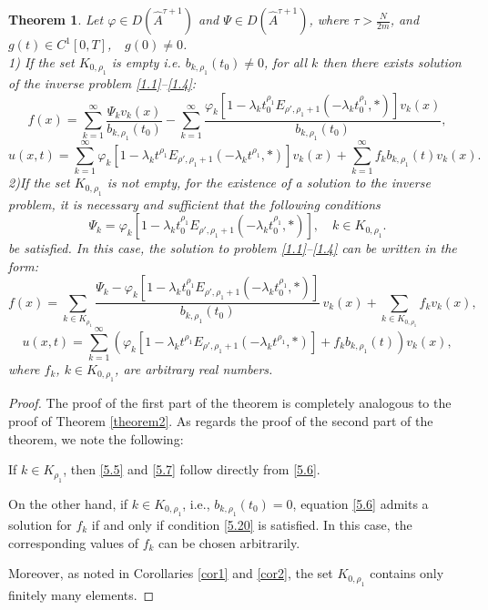 \documentclass[12pt, reqno]{amsart}
\newtheorem{theorem}{Theorem}[section]
\theoremstyle{definition}
\theoremstyle{remark}
\numberwithin{equation}{section}
\begin{document}
\begin{theorem}\label{theorem3}
    Let $\varphi \in D(\widehat{A}^{\tau+1})$ and $\Psi \in D(\widehat{A}^{\tau+1})$, where
$
\tau > \frac{N}{2m}$, and $g(t) \in C^1[0,T]$, \,\, $g(0) \neq 0$.\\
    1) If the set $K_{0,\rho_1}$ is empty i.e. $b_{k,\rho_1}(t_0)\neq 0$, for all $k$ then there exists solution of the inverse problem \eqref{1.1}--\eqref{1.4}:
    $$
    f(x)=\sum_{k=1}^{\infty}\frac{\Psi_k v_k(x)}{b_{k,\rho_1}(t_0)}-\sum_{k=1}^{\infty}\frac{\varphi_k \left[ 1 - \lambda_k t_0^{\rho_1} E_{ \rho', \rho_1 + 1} \left( -\lambda_k t_0^{\rho_1}, * \right) \right]v_k(x)}{b_{k,\rho_1}(t_0)},
    $$
    $$
   u(x,t)= \sum_{k=1}^{\infty}\varphi_k \left[ 1 - \lambda_k t^{\rho_1} E_{ \rho', \rho_1 + 1} \left( -\lambda_k t^{\rho_1}, * \right) \right]v_k(x)+\sum_{k=1}^{\infty}f_kb_{k,\rho_1}(t) v_k(x).
    $$
    2)If the set $K_{0,\rho_1}$ is not empty, for the existence of a solution to the inverse problem, it is necessary and sufficient that the following conditions
    \begin{equation}\label{5.20}
\Psi_k = \varphi_k \left[ 1 - \lambda_k t_0^{\rho_1} E_{ \rho', \rho_1 + 1} \left( -\lambda_k t_0^{\rho_1}, * \right) \right],
\quad k \in K_{0,\rho_1}.
\end{equation}
    be satisfied. In this case, the solution to problem \eqref{1.1}–\eqref{1.4} can be written in the form:
\[
f(x)=\sum_{k\in K_{\rho_1}}
\frac{\Psi_k -\varphi_k \left[ 1 - \lambda_k t_0^{\rho_1} E_{\rho', \rho_1 + 1} \left( -\lambda_k t_0^{\rho_1}, * \right) \right]}
{b_{k,\rho_1}(t_0)}\, v_k(x)
+\sum_{k\in K_{0,\rho_1}} f_k v_k(x),
\]
\[
u(x,t)
=
\sum_{k=1}^{\infty}
\left(\varphi_k
\left[
1-\lambda_k t^{\rho_1}
E_{\rho',\rho_1+1}\!\left(-\lambda_k t^{\rho_1},*\right)
\right]+ f_k b_{k,\rho_1}(t)\right) v_k(x),
\]
where $f_k$, $k \in K_{0,\rho_1}$, are arbitrary real numbers.
\end{theorem}
\begin{proof}
The proof of the first part of the theorem is completely analogous to the proof of Theorem
\ref{theorem2}. As regards the proof of the second part of the theorem, we note the following:

If $k \in K_{\rho_1}$, then \eqref{5.5} and \eqref{5.7} follow directly from \eqref{5.6}.

On the other hand, if $k \in K_{0,\rho_1}$, i.e., $b_{k,\rho_1}(t_0) = 0$, equation \eqref{5.6} admits a solution for $f_k$ if and only if condition \eqref{5.20} is satisfied. In this case, the corresponding values of $f_k$ can be chosen arbitrarily.

Moreover, as noted in Corollaries \eqref{cor1} and \eqref{cor2}, the set $K_{0,\rho_1}$ contains only finitely many elements.
\end{proof}
\end{document}
